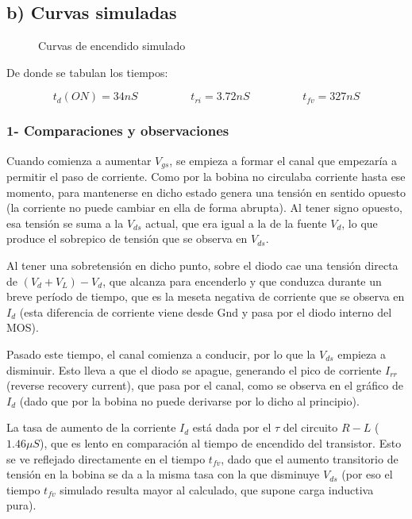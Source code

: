 \documentclass[e4_tp1_main.tex]{subfiles}
\begin{document}
\newpage 
 
\subsection*{b) Curvas simuladas} 
 
\begin{figure}[H]
\centering
\caption{Curvas de encendido simulado}
\end{figure}

De donde se tabulan los tiempos:

\[
t_d(ON) = 34nS \hspace{2cm} t_{ri} = 3.72nS \hspace{2cm} t_{fv} = 327nS
\]

\subsubsection*{1- Comparaciones y observaciones}

Cuando comienza a aumentar $V_{gs}$, se empieza a formar el canal que empezaría a permitir el paso de corriente. Como por la bobina no circulaba corriente hasta ese momento, para mantenerse en dicho estado genera una tensión en sentido opuesto (la corriente no puede cambiar en ella de forma abrupta). Al tener signo opuesto, esa tensión se suma a la $V_{ds}$ actual, que era igual a la de la fuente $V_d$, lo que produce el sobrepico de tensión que se observa en $V_{ds}$.\par
Al tener una sobretensión en dicho punto, sobre el diodo cae una tensión directa de $(V_{d} + V_L) - V_d$, que alcanza para encenderlo y que conduzca durante un breve período de tiempo, que es la meseta negativa de corriente que se observa en $I_d$ (esta diferencia de corriente viene desde Gnd y pasa por el diodo interno del MOS).\par
Pasado este tiempo, el canal comienza a conducir, por lo que la $V_{ds}$ empieza a disminuir. Esto lleva a que el diodo se apague, generando el pico de corriente $I_{rr}$ (reverse recovery current), que pasa por el canal, como se observa en el gráfico de $I_d$ (dado que por la bobina no puede derivarse por lo dicho al principio).\par
La tasa de aumento de la corriente $I_d$ está dada por el $\tau$ del circuito $R-L$ ($1.46\mu S$), que es lento en comparación al tiempo de encendido del transistor. Esto se ve reflejado directamente en el tiempo $t_{fv}$, dado que el aumento transitorio de tensión en la bobina se da a la misma tasa con la que disminuye $V_{ds}$ (por eso el tiempo $t_{fv}$ simulado resulta mayor al calculado, que supone carga inductiva pura).
\end{document}
